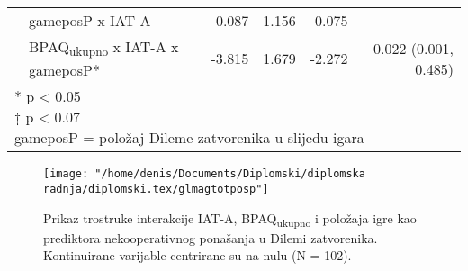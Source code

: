 \documentclass[a4paper, 12pt]{report}
\begin{document}
\begin{table}
\begin{center}
\begin{tabular}{llrrrr}
        &gameposP x IAT-A & 0.087 & 1.156 & 0.075 &\\
        & BPAQ\textsubscript{ukupno} x IAT-A x gameposP* & -3.815 &
        1.679 & -2.272 & 0.022 (0.001, 0.485)\\
        \bottomrule
        \multicolumn{6}{l}{
            \parbox{9cm}{\scriptsize \vspace{3pt} 
                * p < 0.05\\
                $\ddagger$ p < 0.07\\
                gameposP = položaj Dileme zatvorenika u slijedu igara
        }}
    \end{tabular}
\end{center}
\end{table}

\begin{figure}
    \begin{center}
        \caption{\label{glmtotposPplot} Prikaz trostruke interakcije IAT-A,
            BPAQ\textsubscript{ukupno} i položaja igre kao prediktora
            nekooperativnog ponašanja u Dilemi zatvorenika. Kontinuirane
            varijable centrirane su na nulu (N = 102).}
        \texttt{[image: "/home/denis/Documents/Diplomski/diplomska radnja/diplomski.tex/glmagtotposp"]}
    \end{center}
\end{figure}
\end{document}
